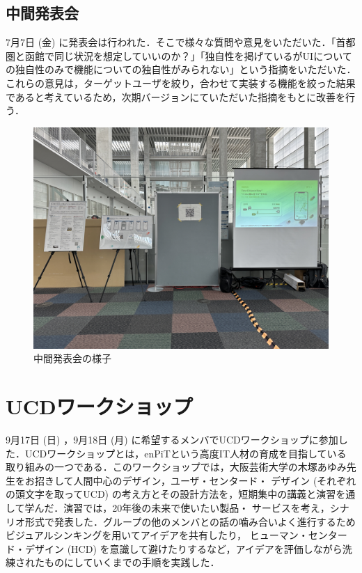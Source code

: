 \subsection{中間発表会}
7月7日 (金) に発表会は行われた．そこで様々な質問や意見をいただいた．「首都圏と函館で同じ状況を想定していいのか？」「独自性を掲げているがUIについての独自性のみで機能についての独自性がみられない」という指摘をいただいた．これらの意見は，ターゲットユーザを絞り，合わせて実装する機能を絞った結果であると考えているため，次期バージョンにていただいた指摘をもとに改善を行う．

\begin{figure}[htbp]
    \centering
    \includegraphics[width=12cm]{images/mid_presentation.png}
    \caption{中間発表会の様子}
    \label{fig:mid_presentation}
\end{figure}

\section{UCDワークショップ}
9月17日 (日) ，9月18日 (月) に希望するメンバでUCDワークショップに参加した．UCDワークショップとは，enPiTという高度IT人材の育成を目指している
取り組みの一つである．このワークショップでは，大阪芸術大学の木塚あゆみ先生をお招きして人間中心のデザイン，ユーザ・センタード・
デザイン (それぞれの頭文字を取ってUCD) の考え方とその設計方法を，短期集中の講義と演習を通して学んだ．演習では，20年後の未来で使いたい製品・
サービスを考え，シナリオ形式で発表した．グループの他のメンバとの話の噛み合いよく進行するためビジュアルシンキングを用いてアイデアを共有したり，
ヒューマン・センタード・デザイン (HCD) を意識して避けたりするなど，アイデアを評価しながら洗練されたものにしていくまでの手順を実践した．

